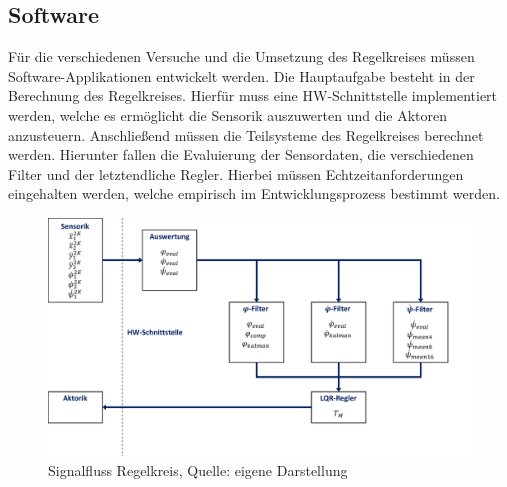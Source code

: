 \subsection{Software}
Für die verschiedenen Versuche und die Umsetzung des Regelkreises müssen Software-Applikationen entwickelt werden. Die Hauptaufgabe besteht in der Berechnung des Regelkreises. Hierfür muss eine HW-Schnittstelle implementiert werden, welche es ermöglicht die Sensorik auszuwerten und die Aktoren anzusteuern. Anschließend müssen die Teilsysteme des Regelkreises berechnet werden. Hierunter fallen die Evaluierung der Sensordaten, die verschiedenen Filter und der letztendliche Regler. Hierbei müssen Echtzeitanforderungen eingehalten werden, welche empirisch im Entwicklungsprozess bestimmt werden.
\begin{figure}[!h]
\centering
\includegraphics[width=0.6\linewidth]{img/SW_signalfluss_regelkreis}
\caption{Signalfluss Regelkreis, Quelle: eigene Darstellung}
\label{img_signalfluss_regelkreis}
\end{figure}

